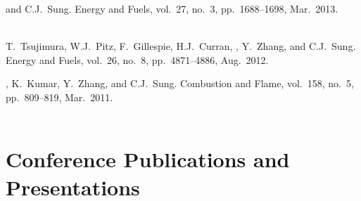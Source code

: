 \begin{bibmune}
\item {} and C.J.\ Sung. 
        Energy and Fuels, vol.\ 27, no.\ 3, pp.\ 1688--1698, Mar.\ 2013.\\
        \\

\item T.\ Tsujimura, W.J.\ Pitz, F.\ Gillespie, H.J.\ Curran,
        , Y.\ Zhang, and C.J.\ Sung.
         Energy and Fuels, vol.\ 26, no.\ 8, pp.\ 4871--4886,
        Aug.\ 2012.\\

\item {}, K.\ Kumar, Y.\ Zhang, and C.J.\ Sung.
         Combustion and Flame,
        vol.\ 158, no.\ 5, pp.\ 809--819, Mar.\ 2011.\\
        \\
\end{bibmune}

\section{{\sectionfont Conference Publications and Presentations}}

